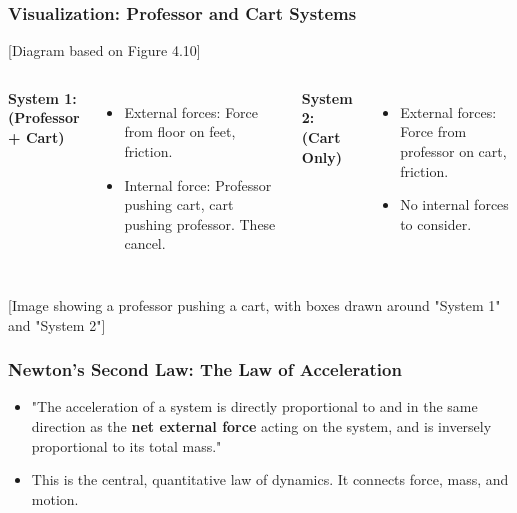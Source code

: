 \documentclass{beamer}
\begin{document}
\begin{frame}
\frametitle{Visualization: Professor and Cart Systems}
\begin{alertblock}{[Diagram based on Figure 4.10]}
\begin{columns}[T]
    \textbf{System 1: (Professor + Cart)}
    \begin{itemize}
        \item External forces: Force from floor on feet, friction.
        \item Internal force: Professor pushing cart, cart pushing professor. These cancel.
    \end{itemize}
    \textbf{System 2: (Cart Only)}
    \begin{itemize}
        \item External forces: Force from professor on cart, friction.
        \item No internal forces to consider.
    \end{itemize}
\end{columns}
\alert{[Image showing a professor pushing a cart, with boxes drawn around "System 1" and "System 2"]}
\end{alertblock}
\end{frame}

\begin{frame}
\frametitle{Newton's Second Law: The Law of Acceleration}
\begin{itemize}
    \item "The acceleration of a system is directly proportional to and in the same direction as the \textbf{net external force} acting on the system, and is inversely proportional to its total mass." \pause
    \item This is the central, quantitative law of dynamics. It connects force, mass, and motion.
\end{itemize}
\end{frame}
\end{document}
